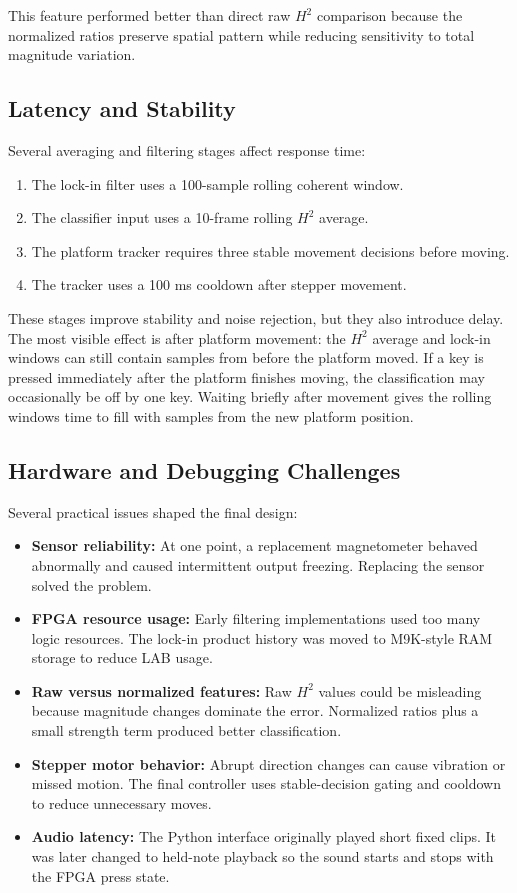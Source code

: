 This feature performed better than direct raw $H^2$ comparison because the normalized ratios preserve spatial pattern while reducing sensitivity to total magnitude variation.

\subsection{Latency and Stability}

Several averaging and filtering stages affect response time:

\begin{enumerate}
    \item The lock-in filter uses a 100-sample rolling coherent window.
    \item The classifier input uses a 10-frame rolling $H^2$ average.
    \item The platform tracker requires three stable movement decisions before moving.
    \item The tracker uses a 100 ms cooldown after stepper movement.
\end{enumerate}

These stages improve stability and noise rejection, but they also introduce delay. The most visible effect is after platform movement: the $H^2$ average and lock-in windows can still contain samples from before the platform moved. If a key is pressed immediately after the platform finishes moving, the classification may occasionally be off by one key. Waiting briefly after movement gives the rolling windows time to fill with samples from the new platform position.

\subsection{Hardware and Debugging Challenges}

Several practical issues shaped the final design:

\begin{itemize}
    \item \textbf{Sensor reliability:} At one point, a replacement magnetometer behaved abnormally and caused intermittent output freezing. Replacing the sensor solved the problem.
    \item \textbf{FPGA resource usage:} Early filtering implementations used too many logic resources. The lock-in product history was moved to M9K-style RAM storage to reduce LAB usage.
    \item \textbf{Raw versus normalized features:} Raw $H^2$ values could be misleading because magnitude changes dominate the error. Normalized ratios plus a small strength term produced better classification.
    \item \textbf{Stepper motor behavior:} Abrupt direction changes can cause vibration or missed motion. The final controller uses stable-decision gating and cooldown to reduce unnecessary moves.
    \item \textbf{Audio latency:} The Python interface originally played short fixed clips. It was later changed to held-note playback so the sound starts and stops with the FPGA press state.
\end{itemize}
